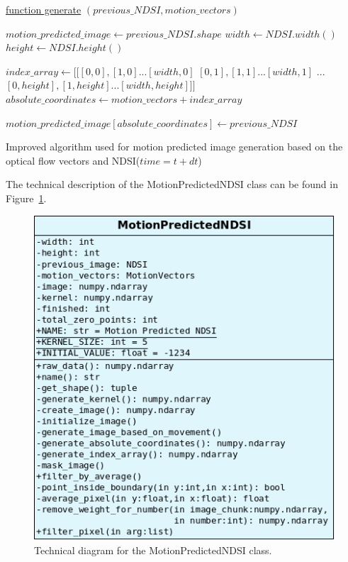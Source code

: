 \documentclass[12pt, a4paper]{report}
\begin{document}
	\begin{algorithm}
		
		\underline{function generate} $(previous\_NDSI, motion\_vectors)$\;
		
		$motion\_predicted\_image \gets previous\_NDSI.shape$\;
		$width \gets NDSI.width()$\;
		$height \gets NDSI.height()$\;
		
		$index\_array \gets [[[0, 0], [1, 0] ... [width, 0]$
		$[0, 1], [1, 1] ... [width, 1]$
		$...$
		$[0, height], [1, height] ... [width, height]]]$\;
		$absolute\_coordinates \gets motion\_vectors + index\_array$\;
		
		$motion\_predicted\_image[absolute\_coordinates] \gets previous\_NDSI$\;
	
		\;
		
		\caption{Improved algorithm used for motion predicted image generation based on the optical flow vectors and NDSI(\(time=t+dt\))}
		\label{algo:improved_generation}
	\end{algorithm}

	\par The technical description of the MotionPredictedNDSI class can be found in Figure~\ref{fig:motion_predicted_diagram}.
	
	\begin{figure}[h!]
		\centering
		\includegraphics[scale=0.6]{../images/motion_created_diagram.png}
		\caption{Technical diagram for the MotionPredictedNDSI class.}
		\label{fig:motion_predicted_diagram}
	\end{figure}
\end{document}
